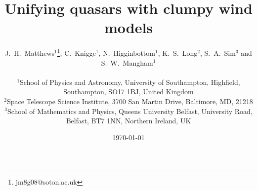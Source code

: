 \documentclass[preprint, a4paper, 11pt]{aastex}
\begin{document}


\def\py{\textsc{Python}}
\def\tar{\textsc{Tardis}}
\def\cld{\textsc{Cloudy}}
\def\agn{\textsc{Agnspec}}


\def\civ{C~\textsc{iv}}
\def\nv{N~\textsc{v}}
\def\hei{He~\textsc{i}}
\def\heii{He~\textsc{ii}}
\def\mg{Mg~\textsc{ii}}
\def\al{Al~\textsc{iii}}
\def\heii{He~\textsc{ii}}
\def\ovi{O~\textsc{vi}}
\def\la{Ly~$\alpha$}
\def\ha{H~$\alpha$}
\def\hb{H~$\beta$}



\def\araa{ARAA}
\def\nat{Nature}
\def\apjl{ApJ Letters}
\def\aapr{AAPR}
\def\ssr{SSR}
\def\apj{ApJ}
\def\apjs{ApJs}
\def\pasp{PASP}
\def\aap{A\&A}
\def\mnras{MNRAS}
\def\aj{AJ}
\def\rmxaa{RMXAA}
\def\aaps{A\&As}

%
%

\title
{
Unifying quasars with clumpy wind models
}



\author{
\parbox[t]{\textwidth}{
J.~H.~Matthews$^1$\thanks{jm8g08@soton.ac.uk}, C.~Knigge$^1$,
N.~Higginbottom$^1$, K.~S.~Long$^2$, S.~A.~Sim$^3$ and S.~W.~Mangham$^1$
}
\medskip  
\\$^1$School of Physics and Astronomy, University of Southampton, Highfield, Southampton, SO17 1BJ, United Kingdom
\\$^2$Space Telescope Science Institute, 3700 San Martin Drive, Baltimore, MD, 21218
\\$^3$School of Mathematics and Physics, Queens University Belfast, University Road, Belfast, BT7 1NN, Northern Ireland, UK
}

\date{\today}


%
%
\end{document}
